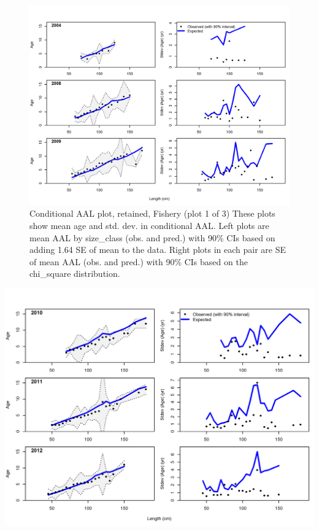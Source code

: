 \documentclass[12pt,]{article}
\begin{document}
\FloatBarrier

\begin{figure}
\centering
\includegraphics{./r4ss/plots_mod1/comp_condAALfit_Andre_plotsflt1mkt2_page1.png}
\caption{Conditional AAL plot, retained, Fishery (plot 1 of 3) These
plots show mean age and std. dev. in conditional AAL. Left plots are
mean AAL by size\_class (obs. and pred.) with 90\% CIs based on adding
1.64 SE of mean to the data. Right plots in each pair are SE of mean AAL
(obs. and pred.) with 90\% CIs based on the chi\_square distribution.
\label{fig:mod1_4_comp_condAALfit_Andre_plotsflt1mkt2_page1}}
\end{figure}

\includegraphics{./r4ss/plots_mod1/comp_condAALfit_Andre_plotsflt1mkt2_page2.png}
\end{document}
